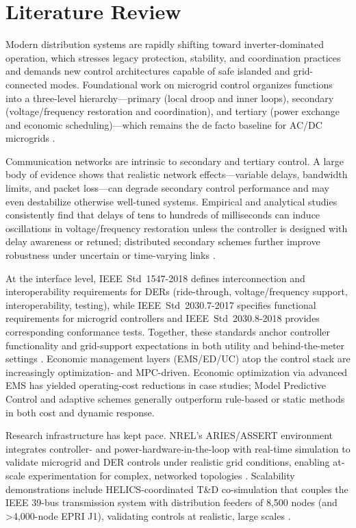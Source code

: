 \documentclass[12pt]{article}
\begin{document}
\section{Literature Review}
\vspace{-0.5cm}
Modern distribution systems are rapidly shifting toward inverter-dominated operation, which stresses legacy protection, stability, and coordination practices and demands new control architectures capable of safe islanded and grid-connected modes. Foundational work on microgrid control organizes functions into a three-level hierarchy---primary (local droop and inner loops), secondary (voltage/frequency restoration and coordination), and tertiary (power exchange and economic scheduling)---which remains the de facto baseline for AC/DC microgrids \cite{Guerrero2011Hierarchical}.

Communication networks are intrinsic to secondary and tertiary control. A large body of evidence shows that realistic network effects---variable delays, bandwidth limits, and packet loss---can degrade secondary control performance and may even destabilize otherwise well-tuned systems. Empirical and analytical studies consistently find that delays of tens to hundreds of milliseconds can induce oscillations in voltage/frequency restoration unless the controller is designed with delay awareness or retuned; distributed secondary schemes further improve robustness under uncertain or time-varying links \cite{Tavassoli2020CommEffects,Liu2015DelaySecondary,Lu2017DistributedSecondary}.

At the interface level, IEEE~Std~1547-2018 defines interconnection and interoperability requirements for DERs (ride-through, voltage/frequency support, interoperability, testing), while IEEE~Std~2030.7-2017 specifies functional requirements for microgrid controllers and IEEE~Std~2030.8-2018 provides corresponding conformance tests. Together, these standards anchor controller functionality and grid-support expectations in both utility and behind-the-meter settings \cite{IEEE1547_2018,IEEE2030_7_2017,IEEE2030_8_2018}.
Economic management layers (EMS/ED/UC) atop the control stack are increasingly optimization- and MPC-driven. Economic optimization via advanced EMS has yielded operating-cost reductions in case studies; Model Predictive Control and adaptive schemes generally outperform rule-based or static methods in both cost and dynamic response.


Research infrastructure has kept pace. NREL’s ARIES/ASSERT environment integrates controller- and power-hardware-in-the-loop with real-time simulation to validate microgrid and DER controls under realistic grid conditions, enabling at-scale experimentation for complex, networked topologies \cite{Chanda_ASSERT_ATEE_2023,NREL_ARIES_Capabilities_2025,NREL_ARIES_ResearchPlan_2021}. Scalability demonstrations include HELICS-coordinated T\&D co-simulation that couples the IEEE 39-bus transmission system with distribution feeders of 8,500 nodes (and >4,000-node EPRI J1), validating controls at realistic, large scales \cite{wang2022transmission}.
\end{document}
